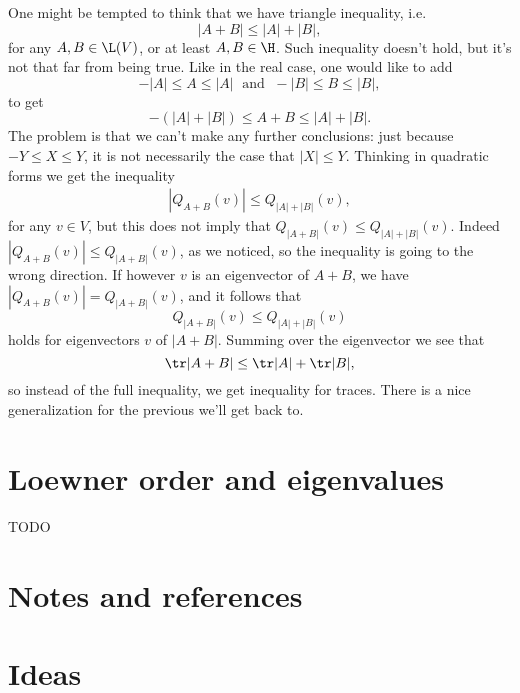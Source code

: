 One might be tempted to think that we have triangle inequality, i.e.
\[
	|A + B| \leq |A| + |B|,
\]
for any $A, B \in \L(V)$, or at least $A, B \in \H$. Such inequality doesn't hold, but it's not that far from being true. Like in the real case, one would like to add
\[
	-|A| \leq A \leq |A| \; \text{ and } \; -|B| \leq B \leq |B|,
\]
to get
\[
	-(|A| + |B|) \leq A + B \leq |A| + |B|.
\]
The problem is that we can't make any further conclusions: just because $-Y \leq X \leq Y$, it is not necessarily the case that $|X| \leq Y$. Thinking in quadratic forms we get the inequality
\begin{align}
	|Q_{A + B}(v)| \leq Q_{|A| + |B|}(v),
\end{align}
for any $v \in V$, but this does not imply that $Q_{|A + B|}(v) \leq Q_{|A| + |B|}(v)$. Indeed $|Q_{A + B}(v)| \leq Q_{|A + B|}(v)$, as we noticed, so the inequality is going to the wrong direction. If however $v$ is an eigenvector of $A + B$, we have $|Q_{A + B}(v)| = Q_{|A + B|}(v)$, and it follows that
\[
	Q_{|A + B|}(v) \leq Q_{|A| + |B|}(v)
\]
holds for eigenvectors $v$ of $|A + B|$. Summing over the eigenvector we see that
\[
	\tr|A + B| \leq \tr |A| + \tr |B|,
\]
so instead of the full inequality, we get inequality for traces. There is a nice generalization for the previous we'll get back to.

\section{Loewner order and eigenvalues}

TODO

\section{Notes and references}

\section{Ideas}

